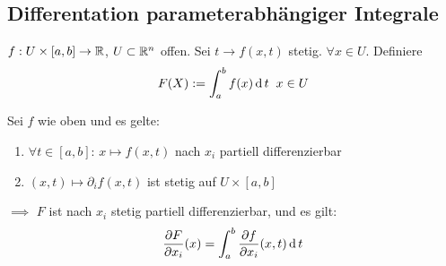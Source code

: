 \subsection{Differentation parameterabhängiger Integrale}
$f:U\times [a,b]\rightarrow\mathbb{R}$, $U\subset\mathbb{R}^n$ offen. Sei $t\to f(x,t)$ stetig. $\forall x\in U$. Definiere
\[F(X):=\int_a^bf(x)\operatorname{d} t\hspace{2mm} x\in U\]
\begin{Sat}
  Sei $f$ wie oben und es gelte:
  \begin{enumerate}
    \item $\forall t\in [a,b]$: $x\mapsto f(x,t)$ nach $x_i$ partiell differenzierbar
    \item $(x,t)\mapsto \partial_if(x,t)$ ist stetig auf $U\times [a,b]$
  \end{enumerate}
  $\implies$ $F$ ist nach $x_i$ stetig partiell differenzierbar, und es gilt:
  \[\dfrac{\partial F}{\partial x_i}(x)=\int_a^b\dfrac{\partial f}{\partial x_i}(x,t)\operatorname{d} t\]
\end{Sat}
